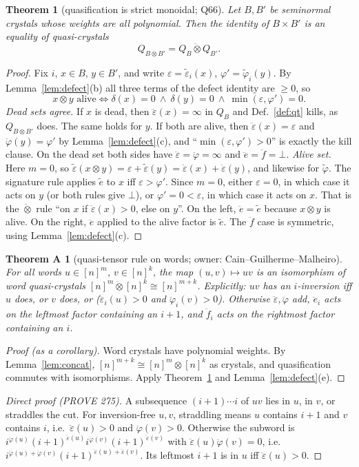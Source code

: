 \documentclass[11pt]{amsart}
\newtheorem{theorem}{Theorem}[section]
\newtheorem*{theoremA}{Theorem A}
\theoremstyle{definition}
\theoremstyle{remark}
\newcommand{\ee}{\ddot e}
\newcommand{\ff}{\ddot f}
\newcommand{\eps}{\ddot\varepsilon}
\newcommand{\vphi}{\ddot\varphi}
\newcommand{\te}{\tilde e}
\newcommand{\teps}{\tilde\varepsilon}
\newcommand{\tphi}{\tilde\varphi}
\newcommand{\qt}{\mathbin{\ddot\otimes}}
\begin{document}
\begin{theorem}[quasification is strict monoidal; Q66]\label{thm:Q66}
Let $B,B'$ be seminormal crystals whose weights are all polynomial. Then the identity of $B\times B'$ is an equality of quasi-crystals
\[Q_{B\otimes B'}=Q_B\qt Q_{B'} .\]
\end{theorem}
\begin{proof}
Fix $i$, $x\in B$, $y\in B'$, and write $\varepsilon=\teps_i(x)$, $\varphi'=\tphi_i(y)$. By Lemma~\ref{lem:defect}(b) all three terms of the defect identity are $\ge0$, so
\[x\otimes y\text{ alive}\iff\delta(x)=0\ \wedge\ \delta(y)=0\ \wedge\ \min(\varepsilon,\varphi')=0.\]
\emph{Dead sets agree.} If $x$ is dead, then $\eps(x)=\infty$ in $Q_B$ and Def.~\ref{def:qt} kills, as $Q_{B\otimes B'}$ does. The same holds for $y$. If both are alive, then $\eps(x)=\varepsilon$ and $\vphi(y)=\varphi'$ by Lemma~\ref{lem:defect}(c), and ``$\min(\varepsilon,\varphi')>0$'' is exactly the kill clause. On the dead set both sides have $\eps=\vphi=\infty$ and $\ee=\ff=\bot$.
\emph{Alive set.} Here $m=0$, so $\teps(x\otimes y)=\varepsilon+\teps(y)=\eps(x)+\eps(y)$, and likewise for $\tphi$. The signature rule applies $\te$ to $x$ iff $\varepsilon>\varphi'$. Since $m=0$, either $\varepsilon=0$, in which case it acts on $y$ (or both rules give $\bot$), or $\varphi'=0<\varepsilon$, in which case it acts on $x$. That is the $\qt$ rule ``on $x$ if $\eps(x)>0$, else on $y$''. On the left, $\ee=\te$ because $x\otimes y$ is alive. On the right, $\ee$ applied to the alive factor is $\te$. The $\ff$ case is symmetric, using Lemma~\ref{lem:defect}(c).
\end{proof}

\begin{theoremA}[quasi-tensor rule on words; owner: Cain--Guilherme--Malheiro]\label{thm:A}
For all words $u\in[n]^m$, $v\in[n]^k$, the map $(u,v)\mapsto uv$ is an isomorphism of word quasi-crystals $[n]^m\qt[n]^k\cong[n]^{m+k}$. Explicitly: $uv$ has an $i$-inversion iff $u$ does, or $v$ does, or ($\eps_i(u)>0$ and $\vphi_i(v)>0$). Otherwise $\eps,\vphi$ add, $\ee_i$ acts on the leftmost factor containing an $i+1$, and $\ff_i$ acts on the rightmost factor containing an $i$.
\end{theoremA}
\begin{proof}[Proof (as a corollary)]
Word crystals have polynomial weights. By Lemma~\ref{lem:concat}, $[n]^{m+k}\cong[n]^m\otimes[n]^k$ as crystals, and quasification commutes with isomorphisms. Apply Theorem~\ref{thm:Q66} and Lemma~\ref{lem:defect}(e).
\end{proof}
\begin{proof}[Direct proof (PROVE 275)]
A subsequence $(i+1)\cdots i$ of $uv$ lies in $u$, in $v$, or straddles the cut. For inversion-free $u,v$, straddling means $u$ contains $i+1$ and $v$ contains $i$, i.e.\ $\eps(u)>0$ and $\vphi(v)>0$. Otherwise the subword is $i^{\vphi(u)}(i+1)^{\eps(u)}i^{\vphi(v)}(i+1)^{\eps(v)}$ with $\eps(u)\vphi(v)=0$, i.e.\ $i^{\vphi(u)+\vphi(v)}(i+1)^{\eps(u)+\eps(v)}$. Its leftmost $i+1$ is in $u$ iff $\eps(u)>0$.
\end{proof}
\end{document}
